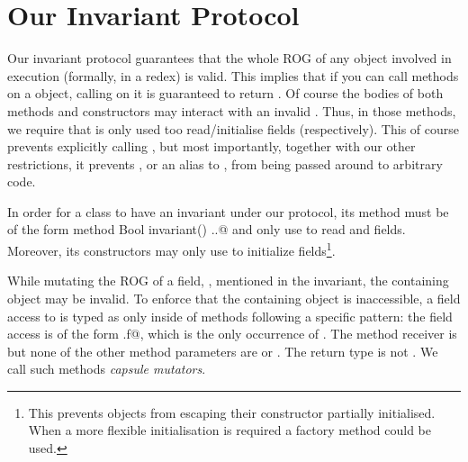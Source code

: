 







\section{Our Invariant Protocol}
\label{s:validate}
Our invariant protocol guarantees that the whole ROG of any object involved in execution (formally, in a redex) is valid.
This implies that if you can call methods on a object, calling \Q@invariant@ on it is guaranteed to return \Q@true@.
Of course the bodies of both \Q@invariant@ methods and constructors may interact with an invalid \Q@this@.
Thus, in those methods, we require that \Q@this@ is only used too read/initialise fields (respectively).
This of course prevents explicitly calling \Q@invariant@, but most importantly, together with our other restrictions, it prevents \Q@this@, or an alias to \Q@this@, from being passed around to arbitrary code.


In order for a class to have an invariant under our protocol,
its \Q@invariant@ method must be of the form \Q@read method Bool invariant() {..}@
and only use \Q@this@ to read \Q@imm@ and \Q@capsule@ fields.
Moreover, its constructors may only use \Q@this@ to initialize fields\footnote{This prevents objects from escaping their constructor partially initialised.
When a more flexible initialisation is required
a factory method could be used.}.

While mutating the ROG of a \Q@capsule@ field, \Q@f@, mentioned in the invariant, the containing object may be invalid.
To enforce that the containing object is inaccessible, 
a field access to \Q@f@ is typed as \Q@mut@ only inside of methods following a specific pattern:
 the field access is of the form \Q@this.f@, which is the only occurrence of \Q@this@.
 The method receiver is \Q@mut@ but none of the other method parameters are \Q@mut@ or \Q@read@.
 The return type is not \Q@mut@.
We call such methods \emph{capsule mutators}.

